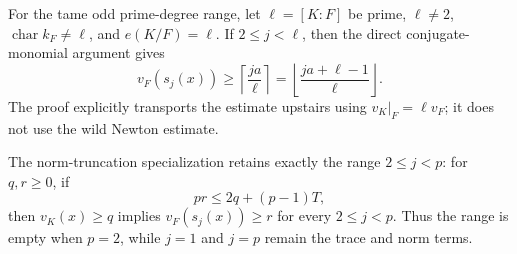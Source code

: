 \begin{theorem}
For the tame odd prime-degree range, let $\ell=[K:F]$ be prime,
$\ell\ne2$, $\operatorname{char}k_F\ne\ell$, and
$e(K/F)=\ell$.  If $2\le j<\ell$, then the direct conjugate-monomial
argument gives
\begin{equation}\label{eq:lean-tame-symmetric-bound}
 v_F(s_j(x))\ge
 \left\lceil\frac{ja}{\ell}\right\rceil
 =\left\lfloor\frac{ja+\ell-1}{\ell}\right\rfloor.
\end{equation}
The proof explicitly transports the estimate upstairs using
$v_K|_F=\ell v_F$; it does not use the wild Newton estimate.

The norm-truncation specialization retains exactly the range
$2\le j<p$: for $q,r\ge0$, if
\[
 pr\le2q+(p-1)T,
\]
then $v_K(x)\ge q$ implies $v_F(s_j(x))\ge r$ for every
$2\le j<p$.  Thus the range is empty when $p=2$, while $j=1$ and $j=p$
remain the trace and norm terms.


\end{theorem}
